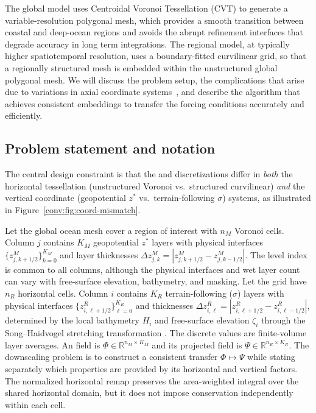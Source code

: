 

The global \MPAS model uses Centroidal Voronoi Tessellation (CVT) to generate a variable-resolution polygonal mesh, which provides a smooth transition between coastal and deep-ocean regions and avoids the abrupt refinement interfaces that degrade accuracy in long term integrations. The regional \ROMS model, at typically higher spatiotemporal resolution, uses a boundary-fitted curvilinear grid, so that a regionally structured mesh is embedded within the unstructured global polygonal mesh. We will discuss the problem setup, the complications that arise due to variations in axial coordinate systems~\citep{petersen2015evaluation}, and describe the algorithm that achieves consistent embeddings to transfer the forcing conditions accurately and efficiently.

\subsection{Problem statement and notation}\label{sec:problem}

The central design constraint is that the \MPAS and \ROMS
discretizations differ in \emph{both} the horizontal tessellation
(unstructured Voronoi vs.\ structured curvilinear) \emph{and} the
vertical coordinate (geopotential $z^*$ vs.\ terrain-following
$\sigma$) systems, as illustrated in Figure~\ref{conv:fig:coord-mismatch}.


Let the {\MPAS} global ocean mesh cover a region of interest with
$n_M$ Voronoi cells. Column $j$ contains $K_M$ geopotential $z^*$
layers with physical interfaces
$\{z^M_{j,k+1/2}\}_{k=0}^{K_M}$ and layer thicknesses
$\Delta z^M_{j,k}=|z^M_{j,k+1/2}-z^M_{j,k-1/2}|$. The level index is
common to all \MPAS columns, although the physical interfaces and wet
layer count can vary with free-surface elevation, bathymetry, and
masking. Let the \ROMS grid have $n_R$ horizontal cells. Column $i$
contains $K_R$ terrain-following ($\sigma$) layers with physical
interfaces $\{z^R_{i,\ell+1/2}\}_{\ell=0}^{K_R}$ and thicknesses
$\Delta z^R_{i,\ell}=|z^R_{i,\ell+1/2}-z^R_{i,\ell-1/2}|$, determined
by the local bathymetry $H_i$ and free-surface elevation $\zeta_i$
through the Song--Haidvogel stretching transformation
\citep{song1994semi,shchepetkin2005regional}. The discrete values are
finite-volume layer averages. An \MPAS field is
$\Phi\in\mathbb{R}^{n_M\times K_M}$ and its projected \ROMS field is
$\Psi\in\mathbb{R}^{n_R\times K_R}$. The downscaling problem is to
construct a consistent transfer $\Phi\mapsto\Psi$ while stating
separately which properties are provided by its horizontal and vertical
factors. The normalized horizontal remap preserves the area-weighted
integral over the shared horizontal domain, but it does not impose
conservation independently within each cell.

